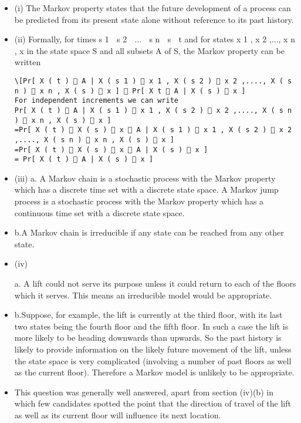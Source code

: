 \documentclass[a4paper,12pt]{article}
\begin{document}
\begin{itemize}
\item (i) The Markov property states that the future development of a process can be
predicted from its present state alone without reference to its past history.
\item (ii) Formally, for times s 1  s 2  ...  s n  s  t and for states x 1 , x 2 ,..., x n , x in the
state space S and all subsets A of S, the Markov property can be written
\begin{verbatim}
\[Pr[ X ( t )  A | X ( s 1 )  x 1 , X ( s 2 )  x 2 ,...., X ( s n )  x n , X ( s )  x ]  Pr[ X t  A | X ( s )  x ]
For independent increments we can write
Pr[ X ( t )  A | X ( s 1 )  x 1 , X ( s 2 )  x 2 ,...., X ( s n )  x n , X ( s )  x ]
=Pr[ X ( t )  X ( s )  x  A | X ( s 1 )  x 1 , X ( s 2 )  x 2 ,...., X ( s n )  x n , X ( s )  x ]
=Pr[ X ( t )  X ( s )  x  A | X ( s )  x ]
= Pr[ X ( t )  A | X ( s )  x ]
\end{verbatim}

\item (iii)
a. A Markov chain is a stochastic process with the Markov property
which has a discrete time set with a discrete state space. A Markov
jump process is a stochastic process with the Markov property which
has a continuous time set with a discrete state space.
\item b.A Markov chain is irreducible if any state can be reached from any
other state.
\item (iv)

a. A lift could not serve its purpose unless it could return to each of the
floors which it serves. This means an irreducible model would be
appropriate.
\item b.Suppose, for example, the lift is currently at the third floor, with its last
two states being the fourth floor and the fifth floor. In such a case the
lift is more likely to be heading downwards than upwards. So the past
history is likely to provide information on the likely future movement
of the lift, unless the state space is very complicated (involving a
number of past floors as well as the current floor). Therefore a Markov
model is unlikely to be appropriate.
\item This question was generally well answered, apart from section (iv)(b) in which few
candidates spotted the point that the direction of travel of the lift as well as its current
floor will influence its next location.
\end{itemize}
\end{document}
